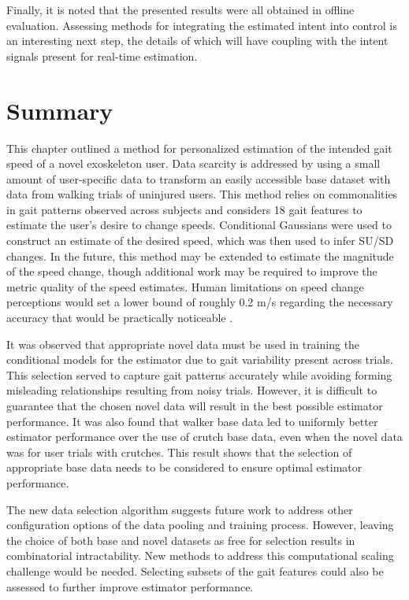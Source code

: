 Finally, it is noted that the presented results were all obtained in offline evaluation. Assessing methods for integrating the estimated intent into control is an interesting next step, the details of which will have coupling with the intent signals present for real-time estimation. 

\section{Summary} \label{sec:conclusion}
%
This chapter outlined a method for personalized estimation of the intended gait speed of a novel exoskeleton user. Data scarcity is addressed by using a small amount of user-specific data to transform an easily accessible base dataset with data from walking trials of uninjured users. This method relies on commonalities in gait patterns observed across subjects and considers 18 gait features to estimate the user's desire to change speeds. Conditional Gaussians were used to construct an estimate of the desired speed, which was then used to infer SU/SD changes. In the future, this method may be extended to estimate the magnitude of the speed change, though additional work may be required to improve the metric quality of the speed estimates. Human limitations on speed change perceptions would set a lower bound of roughly 0.2 m/s regarding the necessary accuracy that would be practically noticeable \cite{zhang2015investigation}.

It was observed that appropriate novel data must be used in training the conditional models for the estimator due to gait variability present across trials. This selection served to capture gait patterns accurately while avoiding forming misleading relationships resulting from noisy trials. However, it is difficult to guarantee that the chosen novel data will result in the best possible estimator performance. It was also found that walker base data led to uniformly better estimator performance over the use of crutch base data, even when the novel data was for user trials with crutches. This result shows that the selection of appropriate base data needs to be considered to ensure optimal estimator performance. 

The new data selection algorithm suggests future work to address other configuration options of the data pooling and training process. However, leaving the choice of both base and novel datasets as free for selection results in  combinatorial intractability. New methods to address this computational scaling challenge would be needed. Selecting subsets of the gait features could also be assessed to further improve estimator performance.